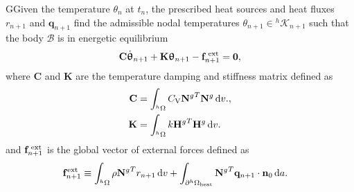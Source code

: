 \begin{problem}
GGiven the temperature $\theta_n$ at $t_n$, the prescribed heat sources and heat fluxes $r_{n+1}$ and $\bm q_{n+1}$ find the admissible nodal temperatures $\theta_{n+1}\in {^h\mathscr{K}_{n+1}}$ such that the body $\mathscr{B}$ is in energetic equilibrium
\begin{equation}
    \mathbf C \dot{ \bm\uptheta}_{n+1} +\mathbf K\bm\uptheta_{n+1}-\mathbf f^\text{\;ext}_{n+1}=\mathbf 0, \label{eq:equilibrium_material}
\end{equation}
where $\mathbf C$ and \(\mathbf K\) are the temperature damping and stiffness matrix defined as
\begin{align}
  \mathbf C &= \int_{{}^h\Omega} C_\mathrm{V} {\mathbf{N}^g}^T \mathbf{N}^g \,\mathrm{d} v.,\\
  \mathbf K &= \int_{{}^h\Omega} k {\mathbf{H}^g}^T\mathbf{H}^g \,\mathrm{d} v.
\end{align}
and $\mathbf f^\text{\;ext}_{n+1}$ is the global vector of external forces defined as
\begin{align}
    \mathbf f^\text{ext}_{n+1} &\equiv \int_{^h\Omega} \rho{\mathbf N^g}^T r_{n+1}\,\mathrm{d} v + \int_{\partial^h\Omega_\text{heat}}{\mathbf N^g}^T \mathbf q_{n+1}\cdot \mathbf n_0\,\mathrm{d} a.
\end{align}
\end{problem}
